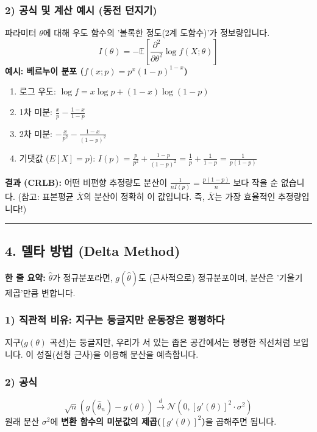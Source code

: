 \documentclass[11pt,a4paper]{book}
\theoremstyle{definition}
\begin{document}
\subsubsection*{2) 공식 및 계산 예시 (동전 던지기)}
파라미터 $\theta$에 대해 우도 함수의 '볼록한 정도(2계 도함수)'가 정보량입니다.
$$ I(\theta) = - \mathbb{E}\left[ \frac{\partial^2}{\partial \theta^2} \log f(X; \theta) \right] $$
\textbf{예시: 베르누이 분포 ($f(x;p) = p^x(1-p)^{1-x}$)}
\begin{enumerate}
    \item 로그 우도: $\log f = x \log p + (1-x) \log (1-p)$
    \item 1차 미분: $\frac{x}{p} - \frac{1-x}{1-p}$
    \item 2차 미분: $-\frac{x}{p^2} - \frac{1-x}{(1-p)^2}$
    \item 기댓값 ($E[X]=p$): $I(p) = \frac{p}{p^2} + \frac{1-p}{(1-p)^2} = \frac{1}{p} + \frac{1}{1-p} = \frac{1}{p(1-p)}$
\end{enumerate}
\textbf{결과 (CRLB):} 어떤 비편향 추정량도 분산이 $\frac{1}{n I(p)} = \frac{p(1-p)}{n}$ 보다 작을 순 없습니다.
(참고: 표본평균 $\bar{X}$의 분산이 정확히 이 값입니다. 즉, $\bar{X}$는 가장 효율적인 추정량입니다!)

\vspace{0.5cm}\hrule\vspace{0.5cm}

\subsection{4. 델타 방법 (Delta Method)}

\begin{conceptbox}[title={개념 4: 함수를 통과한 추정량의 분포}]
\textbf{한 줄 요약:} $\hat{\theta}$가 정규분포라면, $g(\hat{\theta})$도 (근사적으로) 정규분포이며, 분산은 '기울기 제곱'만큼 변합니다.
\end{conceptbox}

\subsubsection*{1) 직관적 비유: 지구는 둥글지만 운동장은 평평하다}
지구($g(\theta)$ 곡선)는 둥글지만, 우리가 서 있는 좁은 공간에서는 평평한 직선처럼 보입니다.
이 성질(선형 근사)을 이용해 분산을 예측합니다.

\subsubsection*{2) 공식}
$$ \sqrt{n}(g(\hat{\theta}_n) - g(\theta)) \xrightarrow{d} \mathcal{N}(0, [g'(\theta)]^2 \cdot \sigma^2) $$
원래 분산 $\sigma^2$에 \textbf{변환 함수의 미분값의 제곱($[g'(\theta)]^2$)}을 곱해주면 됩니다.
\end{document}
